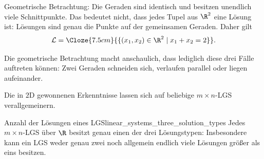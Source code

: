 \begin{itemize}[leftmargin=1.6em,itemsep=1.2em]
\begin{minipage}[t]{\linewidth}
\begin{minipage}[c]{0.64\linewidth}
      \smallskip
      Geometrische Betrachtung: Die Geraden sind identisch und besitzen
      unendlich viele Schnittpunkte. Das bedeutet nicht, dass jedes Tupel aus
      $\R^2$ eine Lösung ist: Lösungen sind genau die Punkte auf der gemeinsamen
      Geraden. Daher gilt
      \[
        \mathcal{L}=\Cloze{7.5cm}{\{(x_1,x_2)\in\R^2\mid x_1+x_2=2\}}.
      \]
    \end{minipage}\hfill
    \begin{minipage}[c]{0.32\linewidth}
      \centering
    \end{minipage}
    \end{minipage}
\end{itemize}

\vspace{\baselineskip}

Die geometrische Betrachtung macht anschaulich, dass lediglich diese drei Fälle
auftreten können: Zwei Geraden schneiden sich, verlaufen parallel oder liegen
aufeinander.

Die in $2\mathrm{D}$ gewonnenen Erkenntnisse lassen sich auf beliebige
$m\times n$-LGS verallgemeinern.
\begin{TheoremBox}{Anzahl der Lösungen eines LGS}{linear_systems_three_solution_types}
  Jedes $m\times n$-LGS über $\R$ besitzt genau einen der drei Lösungstypen:
  \SolutionTypeCases
  Insbesondere kann ein LGS weder genau zwei noch allgemein endlich viele
  Lösungen größer als eins besitzen.
\end{TheoremBox}
